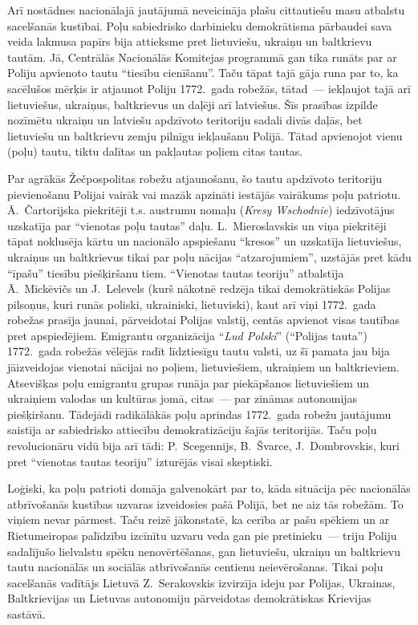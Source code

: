 \documentclass[twoside,a5paper,12pt,fleqn,openany]{extbook}
\newcommand{\pltxti}[1]{\textit{\textpolish{#1}}}
\begin{document}
Arī nostādnes nacionālajā jautājumā neveicināja plašu cittautiešu masu atbalstu sacelšanās kustībai. Poļu sabiedrisko darbinieku demokrātisma pārbaudei sava veida lakmusa papīrs bija attieksme pret lietuviešu, ukraiņu un baltkrievu tautām. Jā, Centrālās Nacionālās Komitejas programmā gan tika runāts par ar Poliju apvienoto tautu ``tiesību cienīšanu''. Taču tāpat tajā gāja runa par to, ka sacēlušos mērķis ir atjaunot Poliju 1772.~gada robežās, tātad~--- iekļaujot tajā arī lietuviešus, ukraiņus, baltkrievus un daļēji arī latviešus. Šīs prasības izpilde nozīmētu ukraiņu un latviešu apdzīvoto teritoriju sadali divās daļās, bet lietuviešu un baltkrievu zemju pilnīgu iekļaušanu Polijā. Tātad apvienojot vienu (poļu) tautu, tiktu dalītas un pakļautas poļiem citas tautas.

Par agrākās Žečpospolitas robežu atjaunošanu, šo tautu apdzīvoto teritoriju pievienošanu Polijai vairāk vai mazāk apzināti iestājās vairākums poļu patriotu. Ā.~Čartorijska piekritēji t.s. austrumu nomaļu (\pltxti{Kresy Wschodnie}) iedzīvotājus uzskatīja par ``vienotas poļu tautas'' daļu. L.~Mieroslavskis un viņa piekritēji tāpat noklusēja kārtu un nacionālo apspiešanu ``kresos'' un uzskatīja lietuviešus, ukraiņus un baltkrievus tikai par poļu nācijas ``atzarojumiem'', uzstājās pret kādu ``īpašu'' tiesību piešķiršanu tiem. ``Vienotas tautas teoriju'' atbalstīja Ā.~Mickēvičs un J.~Lelevels (kurš nākotnē redzēja tikai demokrātiskās Polijas pilsoņus, kuri runās poliski, ukrainiski, lietuviski), kaut arī viņi 1772.~gada robežas prasīja jaunai, pārveidotai Polijas valstij, centās apvienot visas tautības pret apspiedējiem. Emigrantu organizācija ``\pltxti{Lud Polski}'' (``Polijas tauta'') 1772.~gada robežās vēlējās radīt līdztiesīgu tautu valsti, uz šī pamata jau bija jāizveidojas vienotai nācijai no poļiem, lietuviešiem, ukraiņiem un baltkrieviem. Atsevišķas poļu emigrantu grupas runāja par piekāpšanos lietuviešiem un ukraiņiem valodas un kultūras jomā, citas~--- par zināmas autonomijas piešķiršanu. Tādejādi radikālākās poļu aprindas 1772.~gada robežu jautājumu saistīja ar sabiedrisko attiecību demokratizāciju šajās teritorijās. Taču poļu revolucionāru vidū bija arī tādi: P.~Scegennijs, B.~Švarce, J.~Dombrovskis, kuri pret ``vienotas tautas teoriju'' izturējās visai skeptiski.

Loģiski, ka poļu patrioti domāja galvenokārt par to, kāda situācija pēc nacionālās atbrīvošanās kustības uzvaras izveidosies pašā Polijā, bet ne aiz tās robežām. To viņiem nevar pārmest. Taču reizē jākonstatē, ka cerība ar pašu spēkiem un ar Rietumeiropas palīdzību izcīnītu uzvaru veda gan pie pretinieku~--- triju Poliju sadalījušo lielvalstu spēku nenovērtēšanas, gan lietuviešu, ukraiņu un baltkrievu tautu nacionālās un sociālās atbrīvošanās centienu neievērošanas. Tikai poļu sacelšanās vadītājs Lietuvā Z.~Serakovskis izvirzīja ideju par Polijas, Ukrainas, Baltkrievijas un Lietuvas autonomiju pārveidotas demokrātiskas Krievijas sastāvā.
\end{document}
